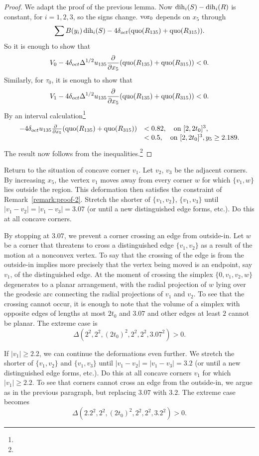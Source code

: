 \begin{proof}
We adapt the proof of the previous lemma.  Now
$\operatorname{dih}_i(S)-\operatorname{dih}_i(R)$ is constant, for $i=1,2,3$, so the signs change.
$\operatorname{vor}_0$ depends on $x_5$ through
$$\sum B(y_i)\operatorname{dih}_i(S) - 4\delta_{oct} (\operatorname{quo}(R_{135})+\operatorname{quo}(R_{315})).$$
So it is enough to show that
    $$
    V_0 - 4\delta_{oct}\Delta^{1/2}u_{135}\frac{\partial}{\partial x_5}
    (\operatorname{quo}(R_{135})+\operatorname{quo}(R_{315}))<0.
    $$
Similarly, for $\tau_0$, it is enough to show that
    $$
        V_1 - 4\delta_{oct}\Delta^{1/2}u_{135}\frac{\partial}{\partial x_5}
    (\operatorname{quo}(R_{135})+\operatorname{quo}(R_{315}))<0.
    $$
By an interval calculation\footnote{} %
    $$
    \begin{array}{lll}
    -4\delta_{oct}  u_{135}\frac{\partial\phantom{x}}{\partial x_5}
    (\operatorname{quo}(R_{135})+\operatorname{quo}(R_{315}))&< 0.82,\quad\hbox{on } [2,2t_0]^3,\\
                            &<0.5,\quad\hbox{on }[2,2t_0]^3, y_5\ge2.189.
    \end{array}
    $$
The result now follows from
the inequalities.\footnote{} %
\end{proof}

Return to the situation of concave corner $v_1$. Let $v_2$, $v_3$ be the
adjacent corners. By increasing $x_5$, the vertex $v_1$ moves away from
every corner $w$ for which $\{v_1,w\}$ lies outside the region.  This
deformation then satisfies the constraint of
Remark~\ref{remark:proof-2}. Stretch the shorter of $\{v_1,v_2\}$,
$\{v_1,v_3\}$ until $|v_1-v_2|=|v_1-v_3|=3.07$ (or until a new
distinguished edge forms, etc.).  Do this at all concave corners.

By stopping at $3.07$, we prevent a corner crossing an edge from
outside-in. Let $w$ be a corner that threatens to cross a
distinguished edge $\{v_1,v_2\}$ as a result of the motion at a
nonconvex vertex.  To say that the crossing of the edge is from
the outside-in implies more precisely that the vertex being moved
is an endpoint, say $v_1$, of the distinguished edge.  At the
moment of crossing the simplex $\{0,v_1,v_2,w\}$ degenerates to a
planar arrangement, with the radial projection of $w$ lying over
the geodesic arc connecting the radial projections of $v_1$ and
$v_2$. To see that the crossing cannot occur, it is enough to note
that the volume of a simplex with opposite edges of lengths at
most $2t_0$ and $3.07$ and other edges at least $2$ cannot be
planar. The extreme case is
    $$\Delta(2^2,2^2,(2t_0)^2,2^2,2^2,3.07^2) > 0.$$

If $|v_1|\ge2.2$, we can continue the deformations even further. We
stretch the shorter of $\{v_1,v_2\}$ and $\{v_1,v_3\}$ until
$|v_1-v_2|=|v_1-v_3|=3.2$ (or until a new distinguished edge forms,
etc.).  Do this at all concave corners $v_1$ for which $|v_1|\ge2.2$. To
see that corners cannot cross an edge from the outside-in, we argue as
in the previous paragraph, but replacing  $3.07$ with $3.2$.  The
extreme case becomes
    $$\Delta(2.2^2,2^2,(2t_0)^2,2^2,2^2,3.2^2) > 0.$$


